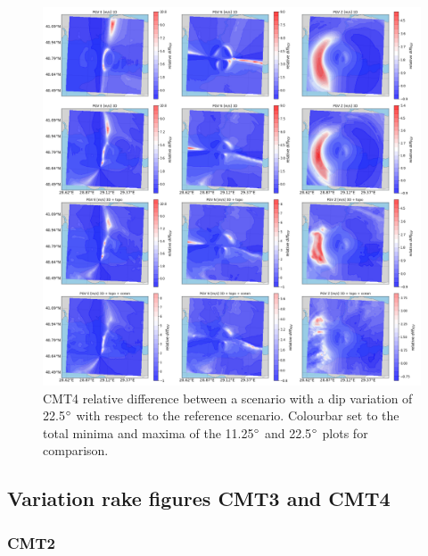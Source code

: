 \documentclass[../Text/00main.tex]{subfiles}
\begin{document}
\begin{figure}[!h]
    \centering
    \includegraphics[width=1\linewidth]{images_results/dip_variation_epsilon25_sc4.png}
    \caption{CMT4 relative difference between a scenario with a dip variation of 22.5$\degree$ with respect to the reference scenario. Colourbar set to the total minima and maxima of the 11.25$\degree$ and 22.5$\degree$ plots for comparison.}
    \label{fig:ref_eps25-2}
\end{figure}

\FloatBarrier

\subsection{Variation rake figures CMT3 and CMT4}

\subsubsection{CMT2}
\end{document}
